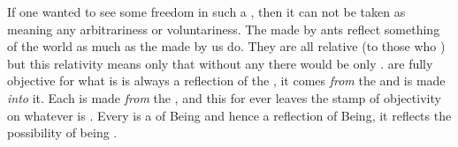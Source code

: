 If one wanted to see some freedom in such a , then it can not be
taken as meaning any arbitrariness or voluntariness. The  made
by ants reflect something of the world as much as the  made by
us do. They are all relative (to those who ) but this relativity
means only that without any  there would be only
.  are fully objective for what is
 is always a reflection of the , it comes {\em
  from} the  and is made {\em into} it.  Each  is
made {\em from} the , and this  for ever leaves the
stamp of objectivity on whatever is .
Every  is a  of Being and hence a reflection of Being,
it reflects the possibility of being . 


